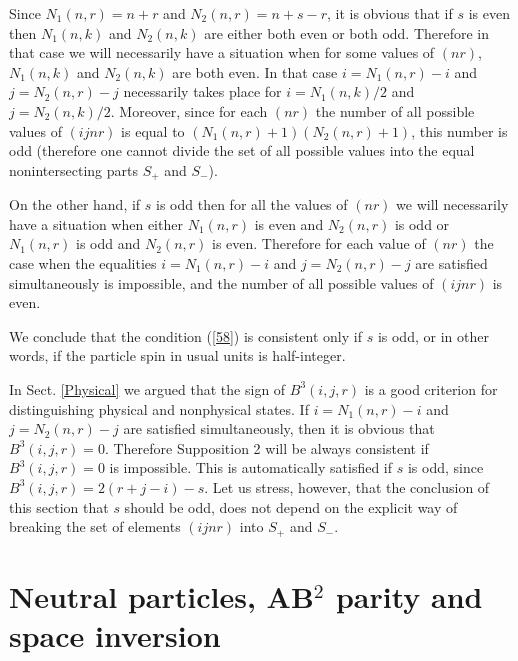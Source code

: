 \documentclass[a4paper,12pt]{article}%
\begin{document}
Since $N_1(n,r)=n+r$ and $N_2(n,r)=n+s-r$, it is
obvious that if $s$ is even then $N_1(n,k)$ and $N_2(n,k)$
are either both even or both odd. Therefore in that
case we will necessarily have a situation when for
some values of $(nr)$, $N_1(n,k)$ and $N_2(n,k)$
are both even. In that case $i=N_1(n,r)-i$
and $j=N_2(n,r)-j$ necessarily takes place for 
$i=N_1(n,k)/2$ and $j=N_2(n,k)/2$. Moreover, since 
for each $(nr)$ the number of all possible values of 
$(ijnr)$
is equal to $(N_1(n,r)+1)(N_2(n,r)+1)$, this 
number is odd (therefore one cannot divide the set
of all possible values into the equal 
nonintersecting parts $S_+$ and $S_-$). 

On the other hand, if $s$ is odd then
for all the values of $(nr)$ we will necessarily have
a situation when either $N_1(n,r)$ is even and
$N_2(n,r)$ is odd or $N_1(n,r)$ is odd and
$N_2(n,r)$ is even. Therefore for each value of 
$(nr)$ the case when the equalities $i=N_1(n,r)-i$
and $j=N_2(n,r)-j$ are satisfied simultaneously
is impossible, 
and the number of all possible values of $(ijnr)$  
is even.

We conclude that the condition (\ref{58}) is
consistent only if $s$ is odd,
or in other words, if the particle spin in usual units
is half-integer. 

In Sect. \ref{Physical} we argued that the sign of
$B^3(i,j,r)$ is a good criterion for 
distinguishing physical and nonphysical states. If
$i=N_1(n,r)-i$ and $j=N_2(n,r)-j$ are satisfied 
simultaneously, then it is obvious that $B^3(i,j,r)=0$.
Therefore Supposition 2 will be always consistent
if $B^3(i,j,r)=0$ is impossible. This is automatically
satisfied if $s$ is odd, since $B^3(i,j,r)=2(r+j-i)-s$. 
Let us stress, however, that the conclusion of this
section that $s$ should be odd, does not depend on 
the explicit way of breaking the set 
of elements $(ijnr)$ into $S_+$ and $S_-$.  

\section{Neutral particles, AB$^2$ parity and space
inversion}
\label{S8}  
 
\end{document}
